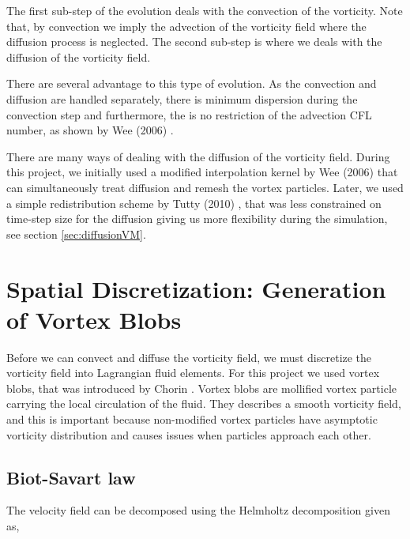 The first sub-step of the evolution deals with the convection of the vorticity. Note that, by convection we imply the advection of the vorticity field where the diffusion process is neglected. The second sub-step is where we deals with the diffusion of the vorticity field. 

There are several advantage to this type of evolution. As the convection and diffusion are handled separately, there is minimum dispersion during the convection step and furthermore, the is no restriction of the advection CFL number, as shown by Wee (2006) \cite{Wee2006}.

There are many ways of dealing with the diffusion of the vorticity field. During this project, we initially used a modified interpolation kernel by Wee (2006) \cite{Wee2006} that can simultaneously treat diffusion and remesh the vortex particles. Later, we used a simple redistribution scheme by Tutty (2010) \cite{2010arXiv1009.0166T}, that was less constrained on time-step size for the diffusion giving us more flexibility during the simulation, see section \ref{sec:diffusionVM}.

\section{Spatial Discretization: Generation of Vortex Blobs}
\label{sec:spatialDiscretization}

Before we can convect and diffuse the vorticity field, we must discretize the vorticity field into Lagrangian fluid elements. For this project we used vortex blobs, that was introduced by Chorin \cite{Cottet2000a}. Vortex blobs are mollified vortex particle carrying the local circulation of the fluid. They describes a smooth vorticity field, and this is important because non-modified vortex particles have asymptotic vorticity distribution and causes issues when particles approach each other.

\subsection{Biot-Savart law}

The velocity field can be decomposed using the Helmholtz decomposition given as,

